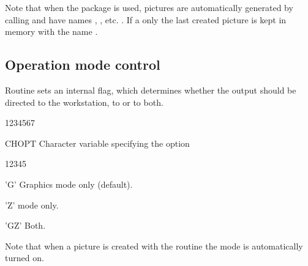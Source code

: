 Note that when the \HPLOT{} package is used, pictures are
automatically generated by calling 
and have names , , etc. . If a 
 only the last created picture is 
kept in memory with the name .
\subsection{Operation mode control}
\Action
Routine 
 sets an internal flag, which determines whether the \HIGZ{}
output should be directed to the workstation, to \ZEBRA{} or to both.
\Pdesc
\begin{DLtt}{1234567}
\item[CHOPT] Character variable specifying the option
\begin{DLtt}{12345}
\item['G'] Graphics mode only (default).
\item['Z'] \ZEBRA{} mode only.
\item['GZ'] Both.
\end{DLtt}
\end{DLtt}
Note that when a picture is created with the routine  the
 mode is automatically turned on.
